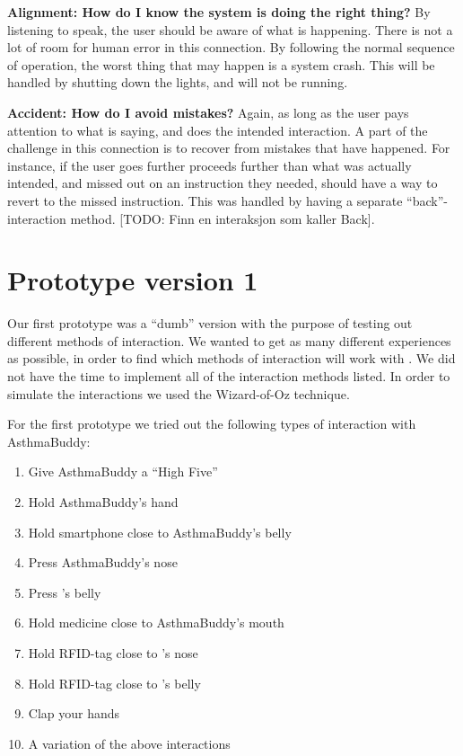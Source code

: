 \textbf{Alignment: How do I know the system is doing the right thing?}
By listening to \buddy{} speak, the user should be aware of what is happening. There is not a lot of room for human error in this connection. By following the normal sequence of operation, the worst thing that may happen is a system crash. This will be handled by shutting down the lights, and \buddy{} will not be running.  

\textbf{Accident: How do I avoid mistakes?}
Again, as long as the user pays attention to what \buddy{} is saying, and does the intended interaction. A part of the challenge in this connection is to recover from mistakes that have happened. For instance, if the user goes further proceeds further than what was actually intended, and missed out on an instruction they needed, \buddy{} should have a way to revert to the missed instruction. This was handled by having a separate ``back''-interaction method.
[TODO: Finn en interaksjon som kaller Back].   


 

\section{Prototype version 1}
\label{sec:proto1}
Our first prototype was a ``dumb'' version with the purpose of testing out different methods of interaction. We wanted to get as many different experiences as possible, in order to find which methods of interaction will work with \ab{}. We did not have the time to implement all of the interaction methods listed. In order to simulate the interactions we used the Wizard-of-Oz technique\cite{wilson1988rapid}. 

For the first prototype we tried out the following types of interaction with AsthmaBuddy:
\begin{enumerate}
	\item{Give AsthmaBuddy a ``High Five''}
	\item{Hold AsthmaBuddy's hand}
	\item{Hold smartphone close to AsthmaBuddy's belly}
	\item{Press AsthmaBuddy's nose}
	\item{Press \buddy{}'s belly}
	\item{Hold medicine close to AsthmaBuddy's mouth}
	\item{Hold RFID-tag close to \buddy{}'s nose}
	\item{Hold RFID-tag close to \buddy{}'s belly}
	\item{Clap your hands}
	\item{A variation of the above interactions}
\end{enumerate}
	
